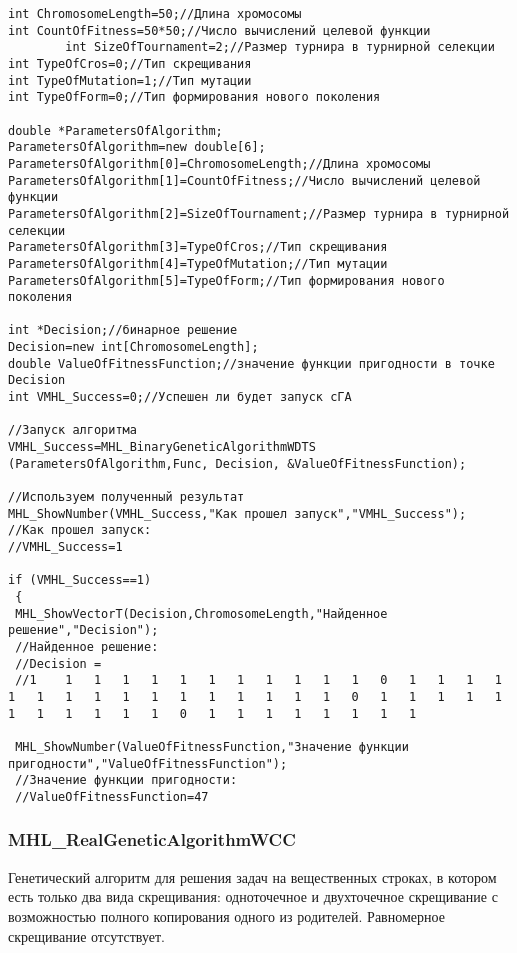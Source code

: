 \documentclass[a4paper,12pt]{article}
\begin{document}
\begin{lstlisting}[label=code_use_MHL_BinaryGeneticAlgorithmWDTS,caption=Пример использования]
int ChromosomeLength=50;//Длина хромосомы
int CountOfFitness=50*50;//Число вычислений целевой функции
		int SizeOfTournament=2;//Размер турнира в турнирной селекции
int TypeOfCros=0;//Тип скрещивания
int TypeOfMutation=1;//Тип мутации
int TypeOfForm=0;//Тип формирования нового поколения

double *ParametersOfAlgorithm;
ParametersOfAlgorithm=new double[6];
ParametersOfAlgorithm[0]=ChromosomeLength;//Длина хромосомы
ParametersOfAlgorithm[1]=CountOfFitness;//Число вычислений целевой функции
ParametersOfAlgorithm[2]=SizeOfTournament;//Размер турнира в турнирной селекции
ParametersOfAlgorithm[3]=TypeOfCros;//Тип скрещивания
ParametersOfAlgorithm[4]=TypeOfMutation;//Тип мутации
ParametersOfAlgorithm[5]=TypeOfForm;//Тип формирования нового поколения

int *Decision;//бинарное решение
Decision=new int[ChromosomeLength];
double ValueOfFitnessFunction;//значение функции пригодности в точке Decision
int VMHL_Success=0;//Успешен ли будет запуск cГА

//Запуск алгоритма
VMHL_Success=MHL_BinaryGeneticAlgorithmWDTS (ParametersOfAlgorithm,Func, Decision, &ValueOfFitnessFunction);

//Используем полученный результат
MHL_ShowNumber(VMHL_Success,"Как прошел запуск","VMHL_Success");
//Как прошел запуск:
//VMHL_Success=1

if (VMHL_Success==1)
 {
 MHL_ShowVectorT(Decision,ChromosomeLength,"Найденное решение","Decision");
 //Найденное решение:
 //Decision =
 //1	1	1	1	1	1	1	1	1	1	1	1	0	1	1	1	1	1	1	1	1	1	1	1	1	1	1	1	1	0	1	1	1	1	1	1	1	1	1	1	1	0	1	1	1	1	1	1	1	1

 MHL_ShowNumber(ValueOfFitnessFunction,"Значение функции пригодности","ValueOfFitnessFunction");
 //Значение функции пригодности:
 //ValueOfFitnessFunction=47
\end{lstlisting}

\subsubsection{MHL\_RealGeneticAlgorithmWCC}\label{MHL_RealGeneticAlgorithmWCC}

Генетический алгоритм для решения задач на вещественных строках, в котором есть только два вида скрещивания: одноточечное и двухточечное скрещивание с возможностью полного копирования одного из родителей. Равномерное скрещивание отсутствует.
\end{document}
